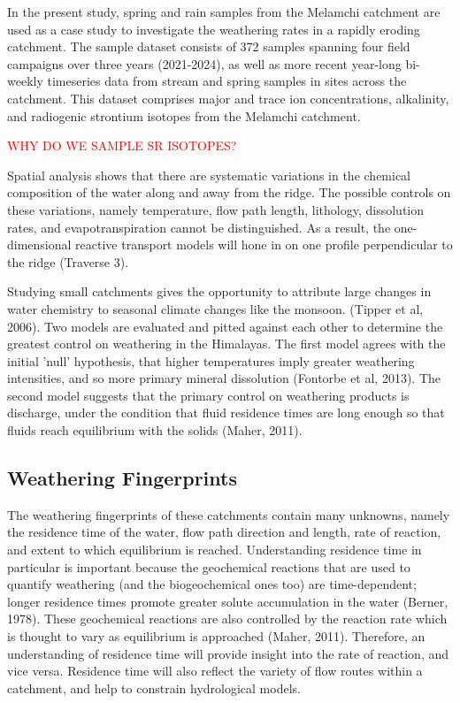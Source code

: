 In the present study, spring and rain samples from the Melamchi catchment are used as a case 
study to investigate the weathering rates in a rapidly eroding catchment. The sample dataset consists of 372 samples spanning four field campaigns over three years (2021-2024), as well as more recent year-long bi-weekly timeseries data from stream and spring samples in sites across the catchment. This dataset comprises major and trace ion concentrations, alkalinity, and radiogenic strontium isotopes from the Melamchi catchment. 

\textcolor{red}{WHY DO WE SAMPLE SR ISOTOPES?}

Spatial analysis shows that there are systematic variations in the chemical composition of the water along and away from the ridge. The possible controls on these variations, namely temperature, flow path length, lithology, dissolution rates, and evapotranspiration cannot be distinguished. As a result, the one-dimensional reactive transport models will hone in on one profile perpendicular to the ridge (Traverse 3). 

\bsk

Studying small catchments gives the opportunity to attribute large changes in water chemistry to seasonal climate changes like the monsoon. (Tipper et al, 2006). Two models are evaluated and pitted against each other to determine the greatest control on weathering in the Himalayas. The first model agrees with the initial 'null' hypothesis, that higher temperatures imply greater weathering intensities, and so more primary mineral dissolution (Fontorbe et al, 2013). The second model suggests that the primary control on weathering products is discharge, under the condition that fluid residence times are long enough so that fluids reach equilibrium with the solids (Maher, 2011).


\subsection{Weathering Fingerprints}

The weathering fingerprints of these catchments contain many unknowns, namely the residence time of the water, flow path direction and length, rate of reaction, and extent to which equilibrium is reached. Understanding residence time in particular is important because the geochemical reactions that are used to quantify weathering (and the biogeochemical ones too) are time-dependent; longer residence times promote greater solute accumulation in the water (Berner, 1978). These geochemical reactions are also controlled by the reaction rate which is thought to vary as equilibrium is approached (Maher, 2011). Therefore, an understanding of residence time will provide insight into the rate of reaction, and vice versa. Residence time will also reflect the variety of flow routes within a catchment, and help to constrain hydrological models.

